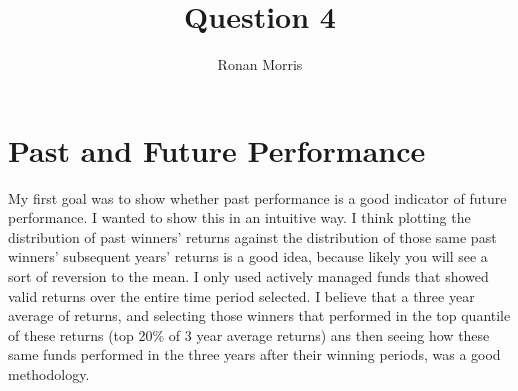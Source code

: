 \documentclass[11pt,preprint, authoryear]{elsarticle}
\numberwithin{equation}{section}
\numberwithin{figure}{section}
\numberwithin{table}{section}
\begin{document}
\begin{frontmatter}  %

\title{Question 4}





\author[Add1]{Ronan Morris}





\address[Add1]{Stellenbosch University}



\vspace{1cm}





\vspace{0.5cm}

\end{frontmatter}

\setcounter{footnote}{0}



\pagestyle{fancy}
\chead{}
\rhead{}
\lfoot{}
\lhead{}
\cfoot{}


\headsep 35pt %




\hypertarget{past-and-future-performance}{%
\section{Past and Future
Performance}\label{past-and-future-performance}}

My first goal was to show whether past performance is a good indicator
of future performance. I wanted to show this in an intuitive way. I
think plotting the distribution of past winners' returns against the
distribution of those same past winners' subsequent years' returns is a
good idea, because likely you will see a sort of reversion to the mean.
I only used actively managed funds that showed valid returns over the
entire time period selected. I believe that a three year average of
returns, and selecting those winners that performed in the top quantile
of these returns (top 20\% of 3 year average returns) ans then seeing
how these same funds performed in the three years after their winning
periods, was a good methodology.
\end{document}
